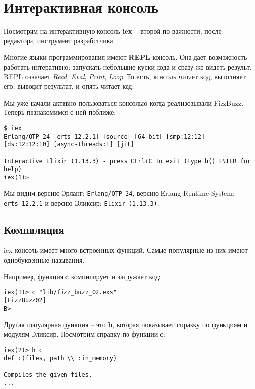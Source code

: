 \chapter{Интерактивная консоль}

Посмотрим на интерактивную консоль \textbf{iex} -- второй по важности, после редактора, инструмент разработчика.

Многие языки программирования имеют \textbf{REPL} консоль. Она дает возможность работать интеративно: запускать небольшие куски кода и сразу же видеть результ. REPL означает \textit{Read}, \textit{Eval}, \textit{Print}, \textit{Loop}. То есть, консоль читает код, выполняет его, выводит результат, и опять читает код.

Мы уже начали активно пользоваться консолью когда реализовывали FizzBuzz. Теперь познакомимся с ней поближе:

\begin{lstlisting}[caption=Запуск консоли,style=elixir-shell]
$ iex
Erlang/OTP 24 [erts-12.2.1] [source] [64-bit] [smp:12:12] [ds:12:12:10] [async-threads:1] [jit]

Interactive Elixir (1.13.3) - press Ctrl+C to exit (type h() ENTER for help)
iex(1)> 
\end{lstlisting}

Мы видим версию Эрланг: \texttt{Erlang/OTP 24}, версию Erlang Runtime System: \texttt{erts-12.2.1} и версию Эликсир: \texttt{Elixir (1.13.3)}.

\section{Компиляция}

iex-консоль имеет много встроенных функций. Самые популярные из них имеют однобуквенные называния. 

Например, функция \textbf{c} компилирует и загружает код:

\begin{lstlisting}
iex(1)> c "lib/fizz_buzz_02.exs"
[FizzBuzz02]
B>
\end{lstlisting}

Другая популярная функция -- это \textbf{h}, которая показывает справку по функциям и модулям Эликсир. Посмотрим справку по функции \textbf{c}:

\begin{lstlisting}
iex(2)> h c
def c(files, path \\ :in_memory)                         

Compiles the given files.
...
\end{lstlisting}

